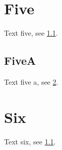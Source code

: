\documentclass{article}
\begin{document}
\section{Five}
Text five, see \ref{../up}.
\subsection{FiveA}\label{../up}
Text five a, see \ref{six}.
\section{Six}\label{six}
Text six, see \ref{../up}.
\end{document}
